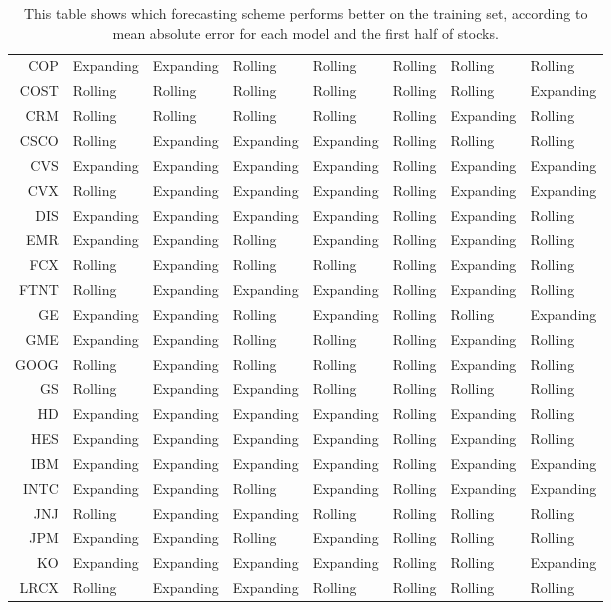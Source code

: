\begin{table}[ht]
\begin{tabular}{rlllllll}
  COP & Expanding & Expanding & Rolling & Rolling & Rolling & Rolling & Rolling \\ 
  COST & Rolling & Rolling & Rolling & Rolling & Rolling & Rolling & Expanding \\ 
  CRM & Rolling & Rolling & Rolling & Rolling & Rolling & Expanding & Rolling \\ 
  CSCO & Rolling & Expanding & Expanding & Expanding & Rolling & Rolling & Rolling \\ 
  CVS & Expanding & Expanding & Expanding & Expanding & Rolling & Expanding & Expanding \\ 
  CVX & Rolling & Expanding & Expanding & Expanding & Rolling & Expanding & Expanding \\ 
  DIS & Expanding & Expanding & Expanding & Expanding & Rolling & Expanding & Rolling \\ 
  EMR & Expanding & Expanding & Rolling & Expanding & Rolling & Expanding & Rolling \\ 
  FCX & Rolling & Expanding & Rolling & Rolling & Rolling & Expanding & Rolling \\ 
  FTNT & Rolling & Expanding & Expanding & Expanding & Rolling & Expanding & Rolling \\ 
  GE & Expanding & Expanding & Rolling & Expanding & Rolling & Rolling & Expanding \\ 
  GME & Expanding & Expanding & Rolling & Rolling & Rolling & Expanding & Rolling \\ 
  GOOG & Rolling & Expanding & Rolling & Rolling & Rolling & Expanding & Rolling \\ 
  GS & Rolling & Expanding & Expanding & Rolling & Rolling & Rolling & Rolling \\ 
  HD & Expanding & Expanding & Expanding & Expanding & Rolling & Expanding & Rolling \\ 
  HES & Expanding & Expanding & Expanding & Expanding & Rolling & Expanding & Rolling \\ 
  IBM & Expanding & Expanding & Expanding & Expanding & Rolling & Expanding & Expanding \\ 
  INTC & Expanding & Expanding & Rolling & Expanding & Rolling & Expanding & Expanding \\ 
  JNJ & Rolling & Expanding & Expanding & Rolling & Rolling & Rolling & Rolling \\ 
  JPM & Expanding & Expanding & Rolling & Expanding & Rolling & Rolling & Rolling \\ 
  KO & Expanding & Expanding & Expanding & Expanding & Rolling & Rolling & Expanding \\ 
  LRCX & Rolling & Expanding & Expanding & Rolling & Rolling & Rolling & Rolling \\ 
   \hline
\end{tabular}
\caption[Better scheme MAE (1)]{This table shows which forecasting scheme performs better on the training set, according to mean absolute error 
              for each model and the first half of stocks.} 
\label{Table:Better_MAE_1}
\end{table}
